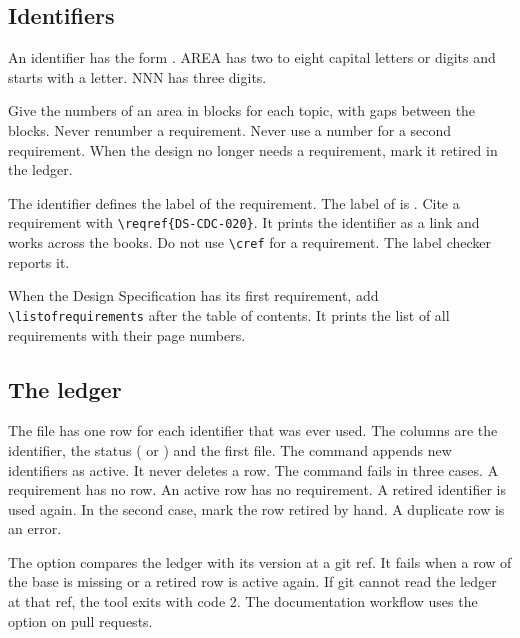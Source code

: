\subsection{Identifiers}
An identifier has the form . AREA has two to eight capital letters or digits and starts with a letter. NNN has three digits.

Give the numbers of an area in blocks for each topic, with gaps between the blocks. Never renumber a requirement. Never use a number for a second requirement. When the design no longer needs a requirement, mark it retired in the ledger.

The identifier defines the label of the requirement. The label of  is . Cite a requirement with \texttt{\textbackslash reqref\{DS-CDC-020\}}. It prints the identifier as a link and works across the books. Do not use \texttt{\textbackslash cref} for a requirement. The label checker reports it.

When the Design Specification has its first requirement, add \texttt{\textbackslash listofrequirements} after the table of contents. It prints the list of all requirements with their page numbers.

\subsection{The ledger}
The file  has one row for each identifier that was ever used. The columns are the identifier, the status ( or ) and the first file. The command  appends new identifiers as active. It never deletes a row. The command  fails in three cases. A requirement has no row. An active row has no requirement. A retired identifier is used again. In the second case, mark the row retired by hand. A duplicate row is an error.

The option  compares the ledger with its version at a git ref. It fails when a row of the base is missing or a retired row is active again. If git cannot read the ledger at that ref, the tool exits with code 2. The documentation workflow uses the option on pull requests.

